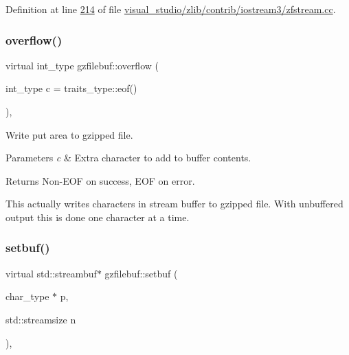 Definition at line \hyperlink{visual__studio_2zlib_2contrib_2iostream3_2zfstream_8cc_source_l00214}{214} of file \hyperlink{visual__studio_2zlib_2contrib_2iostream3_2zfstream_8cc_source}{visual\+\_\+studio/zlib/contrib/iostream3/zfstream.\+cc}.

\mbox{\label{classgzfilebuf_a118cfb494fca6d5ce4d08447ea1fff2b}} 
\subsubsection{\texorpdfstring{overflow()}{overflow()}\hspace{0.1cm}{\footnotesize\ttfamily [2/2]}}
{\footnotesize\ttfamily virtual int\+\_\+type gzfilebuf\+::overflow (\begin{DoxyParamCaption}\item[{int\+\_\+type}]{c = {\ttfamily traits\+\_\+type\+:\+:eof()} }\end{DoxyParamCaption})\hspace{0.3cm}{\ttfamily [protected]}, {\ttfamily [virtual]}}



Write put area to gzipped file. 


\begin{DoxyParams}{Parameters}
{\em c} & Extra character to add to buffer contents. \\
\hline
\end{DoxyParams}
\begin{DoxyReturn}{Returns}
Non-\/\+E\+OF on success, E\+OF on error.
\end{DoxyReturn}
This actually writes characters in stream buffer to gzipped file. With unbuffered output this is done one character at a time. \mbox{\label{classgzfilebuf_a11ff58ab8f4de52cf496892b3a97827e}} 
\subsubsection{\texorpdfstring{setbuf()}{setbuf()}\hspace{0.1cm}{\footnotesize\ttfamily [1/2]}}
{\footnotesize\ttfamily virtual std\+::streambuf$\ast$ gzfilebuf\+::setbuf (\begin{DoxyParamCaption}\item[{char\+\_\+type $\ast$}]{p,  }\item[{std\+::streamsize}]{n }\end{DoxyParamCaption})\hspace{0.3cm}{\ttfamily [protected]}, {\ttfamily [virtual]}}




